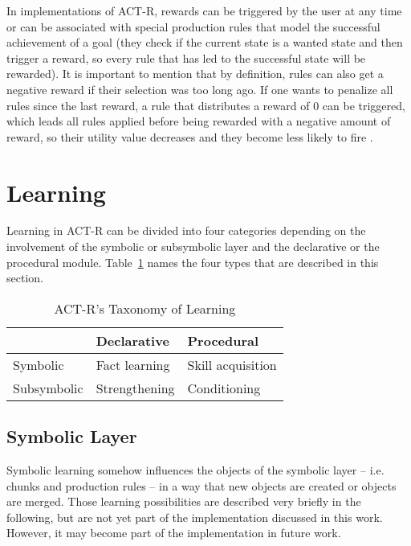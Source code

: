 In implementations of ACT-R, rewards can be triggered by the user at any time or can be associated with special production rules that model the successful achievement of a goal (they check if the current state is a wanted state and then trigger a reward, so every rule that has led to the successful state will be rewarded). It is important to mention that by definition, rules can also get a negative reward if their selection was too long ago. If one wants to penalize all rules since the last reward, a rule that distributes a reward of 0 can be triggered, which leads all rules applied before being rewarded with a negative amount of reward, so their utility value decreases and they become less likely to fire \cite[unit 6, p. 8]{actr_tutorial}.

\section{Learning}

Learning in ACT-R can be divided into four categories depending on the involvement of the symbolic or subsymbolic layer and the declarative or the procedural module. Table~\ref{tab:learning_types} names the four types that are described in this section.

\begin{table}[hbt]
\caption{ACT-R's Taxonomy of Learning \cite[92--95]{anderson_how_2007}}
\label{tab:learning_types}
\begin{center}
\begin{tabular}{|l|ll|}
\hline
 & Declarative & Procedural\\
\hline
Symbolic & Fact learning & Skill acquisition\\
Subsymbolic & Strengthening & Conditioning\\
\hline
\end{tabular}
\end{center}
\end{table}


\subsection{Symbolic Layer}

Symbolic learning somehow influences the objects of the symbolic layer -- i.e. chunks and production rules -- in a way that new objects are created or objects are merged. Those learning possibilities are described very briefly in the following, but are not yet part of the implementation discussed in this work. However, it may become part of the implementation in future work.

